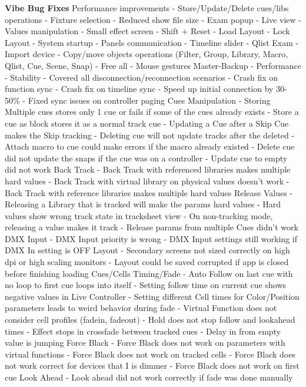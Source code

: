 \documentclass[
]{article}
\begin{document}
\textbf{Vibe Bug Fixes}
Performance improvements
- Store/Update/Delete cues/libs operations
- Fixture selection
- Reduced show file size
- Exam popup
- Live view
- Values manipulation
- Small effect screen
- Shift + Reset
- Load Layout
- Lock Layout
- System startup
- Panels communication
- Timeline slider
- Qlist Exam
- Import device
- Copy/move objects operations (Filter, Group, Library, Macro, Qlist, Cue, Scene, Snap)
- Free all
- Mouse gestures
Master-Backup
- Performance
- Stability
- Covered all disconnection/reconnection scenarios
- Crash fix on function sync
- Crash fix on timeline sync
- Speed up initial connection by 30-50\%
- Fixed sync issues on controller paging
Cues Manipulation
- Storing Multiple cues stores only 1 cue or fails if some of the cues already exists
- Store a cue as block stores it as a normal track cue
- Updating a Cue after a Skip Cue makes the Skip tracking
- Deleting cue will not update tracks after the deleted
- Attach macro to cue could make errors if the macro already existed
- Delete cue did not update the snaps if the cue was on a controller
- Update cue to empty did not work
Back Track
- Back Track with referenced libraries makes multiple hard values
- Back Track with virtual library on physical values doesn't work
- Back Track with reference libraries makes multiple hard values
Release Values
- Releasing a Library that is tracked will make the params hard values
- Hard values show wrong track state in tracksheet view
- On non-tracking mode, releasing a value makes it track
- Release params from multiple Cues didn't work
DMX Input
- DMX Input priority is wrong
- DMX Input settings still working if DMX In setting is OFF
Layout
- Secondary screens not sized correctly on high dpi or high scaling monitors
- Layout could be saved corrupted if app is closed before finishing loading
Cues/Cells Timing/Fade
- Auto Follow on last cue with no loop to first cue loops into itself
- Setting follow time on current cue shows negative values in Live Controller
- Setting different Cell times for Color/Position parameters leads to weird behavior during fade
- Virtual Function does not consider cell profiles (fadein, fadeout)
- Hold does not stop follow and lookahead times
- Effect stops in crossfade between tracked cues
- Delay in from empty value is jumping
Force Black
- Force Black does not work on parameters with virtual functions
- Force Black does not work on tracked cells
- Force Black does not work correct for devices that I is dimmer
- Force Black does not work on first cue
Look Ahead
- Look ahead did not work correctly if fade was done manually
\end{document}
